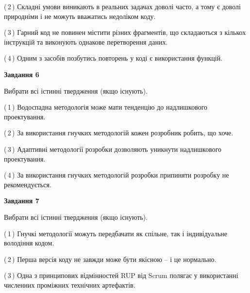 \documentclass[10pt, ukrainian]{article}
\begin{document}
{\begin {large}
(\,2\,) Складні умови виникають в реальних задачах доволі часто, а тому є доволі природніми і не можуть вважатись недоліком коду. %



(\,3\,) Гарний код не повинен містити різних фрагментів, що складаються з кількох інструкцій та виконують однакове перетворення даних. %



(\,4\,) Одним з засобів позбутись повторень у коді є використання функцій. %

\newpage

{\begin {center}\textbf{Завдання 6}\end {center}}\par
Вибрати всі істинні твердження (якщо існують).\par
\vspace{2mm}



(\,1\,) Водоспадна методологія може мати тенденцію до надлишкового проектування. %



(\,2\,) За використання гнучких методологій кожен розробник робить, що хоче. %



(\,3\,) Адаптивні методології розробки дозволяють уникнути надлишкового проектування. %



(\,4\,) За використання гнучких методологій розробки припиняти розробку не рекомендується. %


{\begin {center}\textbf{Завдання 7}\end {center}}\par
Вибрати всі істинні твердження (якщо існують).\par
\vspace{2mm}



(\,1\,) Гнучкі методології можуть передбачати як спільне, так і індивідуальне володіння кодом. %



(\,2\,) Перша версія коду не завжди може бути якісною -- і це нормально. %



(\,3\,) Одна з принципових відмінностей RUP від Scrum полягає у використанні численних проміжних технічних артефактів. %




\end{large}}
\end{document}
